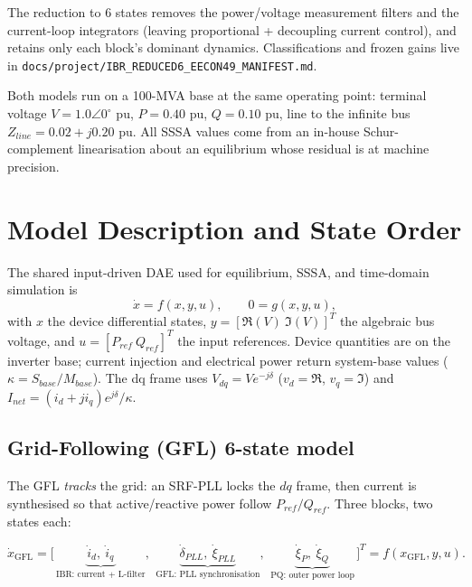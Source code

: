\documentclass[12pt,a4paper]{article}
\begin{document}
The reduction to 6 states removes the power/voltage measurement filters and the
current-loop integrators (leaving proportional + decoupling current control), and
retains only each block's dominant dynamics. Classifications and frozen gains live
in \texttt{docs/project/IBR\_REDUCED6\_EECON49\_MANIFEST.md}.

Both models run on a 100-MVA base at the same operating point: terminal voltage
$V=1.0\angle0^\circ$ pu, $P=0.40$ pu, $Q=0.10$ pu, line to the infinite bus
$Z_{line}=0.02+j0.20$ pu. All SSSA values come from an in-house Schur-complement
linearisation about an equilibrium whose residual is at machine precision.

\section{Model Description and State Order}

The shared input-driven DAE used for equilibrium, SSSA, and time-domain simulation is
\begin{equation}
\dot x = f(x,y,u),\qquad 0 = g(x,y,u),
\label{eq:dae}
\end{equation}
with $x$ the device differential states, $y=[\Re(V)\ \Im(V)]^T$ the algebraic bus
voltage, and $u=[P_{ref}\ Q_{ref}]^T$ the input references. Device quantities are on
the inverter base; current injection and electrical power return system-base values
($\kappa=S_{base}/M_{base}$). The dq frame uses $V_{dq}=Ve^{-j\delta}$ ($v_d=\Re$,
$v_q=\Im$) and $I_{net}=(i_d+ji_q)e^{j\delta}/\kappa$.

\subsection{Grid-Following (GFL) 6-state model}
\label{subsec:gfl}

The GFL \emph{tracks} the grid: an SRF-PLL locks the $dq$ frame, then current is
synthesised so that active/reactive power follow $P_{ref}/Q_{ref}$. Three blocks, two
states each:

\begin{equation}
\dot x_{\text{GFL}} =\Big[\,
\underbrace{\dot i_d,\ \dot i_q}_{\text{IBR: current + L-filter}},\ \,
\underbrace{\dot\delta_{PLL},\ \dot\xi_{PLL}}_{\text{GFL: PLL synchronisation}},\ \,
\underbrace{\dot\xi_{P},\ \dot\xi_{Q}}_{\text{PQ: outer power loop}}
\,\Big]^{T}= f(x_{\text{GFL}},y,u).
\label{eq:gfl-order}
\end{equation}
\end{document}
